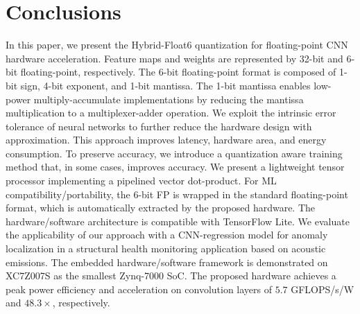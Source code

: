 \section{Conclusions}
\label{sec:conclusions}
In this paper, we present the Hybrid-Float6 quantization for floating-point CNN hardware acceleration. Feature maps and weights are represented by 32-bit and 6-bit floating-point, respectively. The 6-bit floating-point format is composed of 1-bit sign, 4-bit exponent, and 1-bit mantissa. The 1-bit mantissa enables low-power multiply-accumulate implementations by reducing the mantissa multiplication to a multiplexer-adder operation. We exploit the intrinsic error tolerance of neural networks to further reduce the hardware design with approximation. This approach improves latency, hardware area, and energy consumption. To preserve accuracy, we introduce a quantization aware training method that, in some cases, improves accuracy. We present a lightweight tensor processor implementing a pipelined vector dot-product. For ML compatibility/portability, the 6-bit FP is wrapped in the standard floating-point format, which is automatically extracted by the proposed hardware. The hardware/software architecture is compatible with TensorFlow Lite. We evaluate the applicability of our approach with a CNN-regression model for anomaly localization in a structural health monitoring application based on acoustic emissions. The embedded hardware/software framework is demonstrated on XC7Z007S as the smallest Zynq-7000 SoC. The proposed hardware achieves a peak power efficiency and acceleration on convolution layers of $5.7$ GFLOPS/s/W and $48.3\times$, respectively.